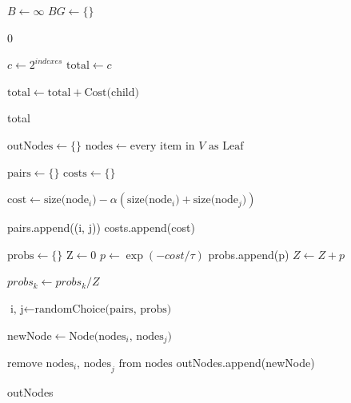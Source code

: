 \documentclass{article}
\begin{document}
\newpage
\begin{algorithm}
\caption{Hyper-Par}
\begin{algorithmic}

\State $B \gets \infty$ 
\State $BG \gets \{\}$ 
\Statex

        \State \Return $0$
    \EndIf
    \Statex

    \State $c \gets 2^{indexes}$
    \State $\text{total} \gets c$
    \Statex

        \State $\text{total} \gets \text{total} + \text{Cost(child)}$
    \EndFor
    \Statex

    \State \Return total
\EndFunction
\Statex

    \State $\text{outNodes} \gets \{\}$
    \State $\text{nodes} \gets \text{every item in $V$ as Leaf}$


        \State $\text{pairs} \gets \{\}$
        \State $\text{costs} \gets \{\}$
        \Statex
        
            \State $\text{cost} \gets \text{size($\text{node}_i$)} - \alpha (\text{size($\text{node}_i$)} + \text{size($\text{node}_j$)})$

            \State pairs.append((i, j))
            \State costs.append(cost)
        \EndFor
        \Statex
        
        \State $\text{probs} \gets \{\}$
        \State $\text{Z} \gets 0$
            \State $p \gets \exp{(-cost / \tau)}$
            \State probs.append(p)
            \State $Z \gets Z + p$
        \EndFor
        \Statex

        
            \State $probs_k \gets probs_k / Z $
        \EndFor

        \State $\text{i, j} \gets \text{randomChoice(pairs, probs)}$
        
        \State $\text{newNode} \gets \text{Node($\text{nodes}_i$, $\text{nodes}_j$)}$

        \State $\text{remove nodes}_i\text{, nodes}_j\text{ from nodes}$
        \State outNodes.append(newNode)
    \EndWhile

    \State \Return outNodes
\EndFunction
\end{algorithmic}
\end{algorithm}
\end{document}
